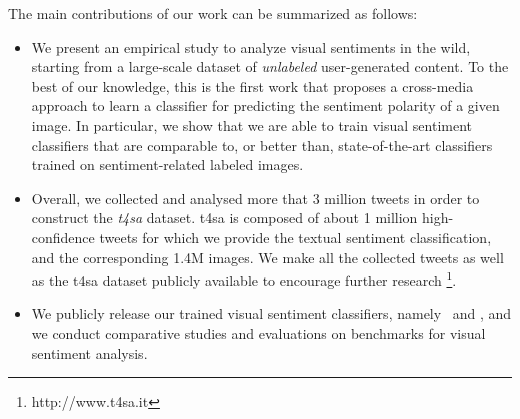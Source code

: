 The main contributions of our work can be summarized as follows:
\begin{itemize}
  \item %
  We present an empirical study to analyze visual sentiments in the wild,
  starting from a large-scale dataset of \emph{unlabeled} user-generated content.
  To the best of our knowledge, this is the first work that proposes %
  a cross-media approach to learn a classifier for predicting the sentiment polarity of a given image.
  In particular, we show that we are able to train visual sentiment classifiers that are comparable to, or better than, state-of-the-art classifiers trained on sentiment-related labeled images.
  \item Overall, we collected and analysed more that 3 million tweets in order to construct the \emph{\acrfull{t4sa}} dataset.
  \gls{t4sa} is composed of about 1 million high-confidence tweets for which we provide the textual sentiment classification, and the corresponding 1.4M images.
  We make all the collected tweets as well as the \gls{t4sa} dataset publicly available to encourage further research \footnote{http://www.t4sa.it}.
  \item We publicly release our trained visual sentiment classifiers, namely  \emph{\ourFtAlex}\, and \emph{\ourFtVGG}, %
  and we conduct comparative studies and evaluations on benchmarks for visual sentiment analysis.
\end{itemize}


